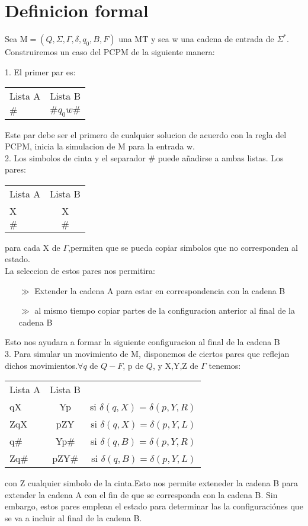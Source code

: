 \documentclass[12pt]{report}
\begin{document}
\section{Definicion formal}
Sea M$=(Q,\Sigma,\Gamma,\delta,q_0,B,F)$ una MT y sea w una cadena de entrada de $\Sigma^*$. Construiremos un caso del PCPM de la siguiente manera:

1. El primer par es:
\begin{center}
 \begin{tabular}{ l  c}
 	Lista A & Lista B\\ 
  	$\#$ & $\# q_0 w \#$\\
 \end{tabular}
\end{center}
Este par debe ser el primero de cualquier solucion de acuerdo con la regla del PCPM, inicia la simulacion de M para la entrada w.\\


2. Los simbolos de cinta y el separador $\#$ puede añadirse a ambas listas. Los pares:
\begin{center}
 \begin{tabular}{ l  c}
 	Lista A & Lista B\\
 	      X & X\\ 
  	   $\#$ & $\#$\\
 \end{tabular}
\end{center}
para cada X de $\Gamma$,permiten que se pueda copiar simbolos que no corresponden al estado.\\
La seleccion de estos pares nos permitira:
\begin{itemize}
\item[$\gg$] Extender la cadena A para estar en correspondencia con la cadena B
\item[$\gg$] al mismo tiempo copiar partes de la configuracion anterior al final de la cadena B
\end{itemize}
Esto nos ayudara a formar la siguiente configuracion al final de la cadena B\\

3. Para simular un movimiento de M, disponemos de ciertos pares que reflejan dichos movimientos.$\forall q $ de $Q-F$, p de $Q$, y X,Y,Z de $\Gamma$ tenemos:
\begin{center}
 \begin{tabular}{ l c r}
 	Lista A & Lista B\\
 	qX & Yp & si $\delta(q,X)=\delta(p,Y,R)$\\
 	ZqX & pZY & si $\delta(q,X)=\delta(p,Y,L)$\\
 	q$\#$ & Yp$\#$ & si $\delta(q,B)=\delta(p,Y,R)$\\
 	Zq$\#$ & pZY$\#$ & si $\delta(q,B)=\delta(p,Y,L)$\\
 \end{tabular}
\end{center}
con Z cualquier simbolo de la cinta.Esto nos permite exteneder la cadena B para extender la cadena A con el fin de que se corresponda con la cadena B. Sin embargo, estos pares emplean el estado para determinar las la configuraciónes que se va a incluir al final de la cadena B.\\
\end{document}

